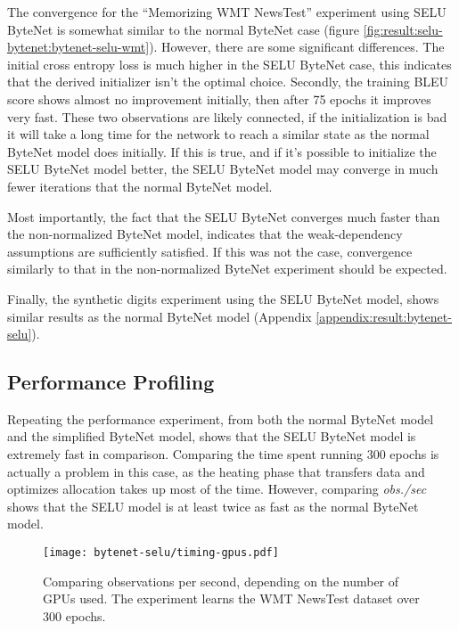 The convergence for the ``Memorizing WMT NewsTest'' experiment using SELU ByteNet is somewhat similar to the normal ByteNet case (figure \ref{fig:result:selu-bytenet:bytenet-selu-wmt}). However, there are some significant differences. The initial cross entropy loss is much higher in the SELU ByteNet case, this indicates that the derived initializer isn't the optimal choice. Secondly, the training BLEU score shows almost no improvement initially, then after 75 epochs it improves very fast. These two observations are likely connected, if the initialization is bad it will take a long time for the network to reach a similar state as the normal ByteNet model does initially. If this is true, and if it's possible to initialize the SELU ByteNet model better, the SELU ByteNet model may converge in much fewer iterations that the normal ByteNet model.

Most importantly, the fact that the SELU ByteNet converges much faster than the non-normalized ByteNet model, indicates that the weak-dependency assumptions are sufficiently satisfied. If this was not the case, convergence similarly to that in the non-normalized ByteNet experiment should be expected.

Finally, the synthetic digits experiment using the SELU ByteNet model, shows similar results as the normal ByteNet model (Appendix \ref{appendix:result:bytenet-selu}).

\clearpage
\subsection{Performance Profiling}

Repeating the performance experiment, from both the normal ByteNet model and the simplified ByteNet model, shows that the SELU ByteNet model is extremely fast in comparison. Comparing the time spent running 300 epochs is actually a problem in this case, as the heating phase that transfers data and optimizes allocation takes up most of the time. However, comparing \textit{obs./sec} shows that the SELU model is at least twice as fast as the normal ByteNet model.

\begin{figure}[h]
    \centering
    \texttt{[image: bytenet-selu/timing-gpus.pdf]}
    \caption{Comparing observations per second, depending on the number of GPUs used. The experiment learns the WMT NewsTest dataset over 300 epochs.}
    \label{fig:result:selu-bytenet:timing-gpus}
\end{figure}

